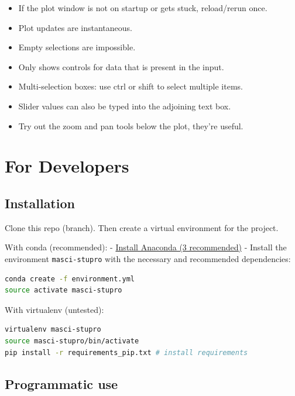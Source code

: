 \begin{itemize}
    \tightlist
\item If the plot window is not on startup or gets stuck, reload/rerun once.
\item Plot updates are instantaneous.
\item Empty selections are impossible.
\item Only shows controls for data that is present in the input.
\item Multi-selection boxes: use ctrl or shift to select multiple items. 
\item Slider values can also be typed into the adjoining text box.
\item Try out the zoom and pan tools below the plot, they're useful.
\end{itemize}

\section{For Developers}\label{for-developers}

\subsection{Installation}\label{installation-1}

Clone this repo (branch). Then create a virtual environment for the project.

With conda (recommended): -
\href{https://www.anaconda.com/download}{Install Anaconda (3
  recommended)} - Install the environment \texttt{masci-stupro} with the
necessary and recommended dependencies:

\begin{lstlisting}[language=bash, style=code]
conda create -f environment.yml
source activate masci-stupro
\end{lstlisting}

With virtualenv (untested):

\begin{lstlisting}[language=bash, style=code]
virtualenv masci-stupro
source masci-stupro/bin/activate
pip install -r requirements_pip.txt # install requirements
\end{lstlisting}

\subsection{Programmatic use}\label{using-the-backend}

